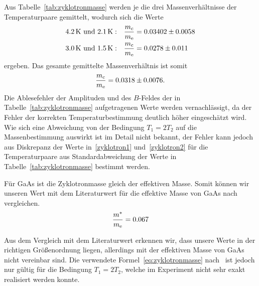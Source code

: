 \documentclass[paper=a4,fontsize=10pt,DIV=18,twocolumn,parskip=half]{scrartcl}
\numberwithin{equation}{section}    %
\begin{document}
Aus Tabelle~\ref{tab:zyklotronmasse} werden je die drei Massenverhältnisse der Temperaturpaare gemittelt, wodurch sich die Werte
\begin{align}
	\SI{4.2}{\kelvin}\text{ und }\SI{2.1}{\kelvin}: && \frac{m_{\rm c}}{m_{\rm e}} &= 0.03402 \pm 0.0058 \label{zyklotron1}\\
	\SI{3.0}{\kelvin}\text{ und }\SI{1.5}{\kelvin}: && \frac{m_{\rm c}}{m_{\rm e}} &= 0.0278 \pm 0.011 \label{zyklotron2}
\end{align}
ergeben. Das gesamte gemittelte Massenverhältnis ist somit
\begin{equation}
	\frac{m_{\rm c}}{m_{\rm e}} = 0.0318 \pm 0.0076.
	\label{zyklotronmasse}
\end{equation}
Die Ablesefehler der Amplituden und des $B$-Feldes der in Tabelle~\ref{tab:zyklotronmasse} aufgetragenen Werte werden vernachlässigt, da der Fehler der korrekten Temperaturbestimmung deutlich höher eingeschätzt wird.
Wie sich eine Abweichung von der Bedingung $T_{1}=2T_{2}$ auf die Massenbestimmung auswirkt ist im Detail nicht bekannt, der Fehler kann jedoch aus Diskrepanz der Werte in~\eqref{zyklotron1} und~\eqref{zyklotron2} für die Temperaturpaare aus Standardabweichung der Werte in Tabelle~\ref{tab:zyklotronmasse} bestimmt werden.

Für GaAs ist die Zyklotronmasse gleich der effektiven Masse. Somit können wir unseren Wert mit dem Literaturwert für die effektive Masse von GaAs nach~\citet{saarland} vergleichen.
\begin{equation}
	\frac{m^*}{m_{\rm e}} = 0.067
\end{equation}

Aus dem Vergleich mit dem Literaturwert erkennen wir, dass unsere Werte in der richtigen Größenordnung liegen, allerdings mit der effektiven Masse von GaAs nicht vereinbar sind. Die verwendete Formel~\eqref{eq:zyklotronmasse} nach~\citet{ando} ist jedoch nur gültig für die Bedingung $T_1=2T_2$, welche im Experiment nicht sehr exakt realisiert werden konnte.

%
%
~~~~~~~~~~~~~~~~~~~~~~~~~~~~~~~~~~~~~~~~~~~~~~~~~~~~~~~~~~~~~~~~~~~~~~~~~~~~~
\end{document}
